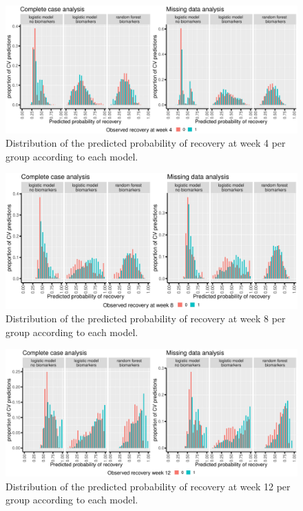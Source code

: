 \documentclass[12pt]{article}
\begin{document}
\begin{figure}[!h]
\centering
\includegraphics[trim={0 0 0 0},width=\textwidth]{./../figures/hist-pred-week4.pdf}
\caption{\label{fig:perfW4-dens}Distribution of the predicted probability of recovery at week 4 per group according to each model.}
\end{figure}

\begin{figure}[!h]
\centering
\includegraphics[trim={0 0 0 0},width=\textwidth]{./../figures/hist-pred-week8.pdf}
\caption{\label{fig:perfW8-dens}Distribution of the predicted probability of recovery at week 8 per group according to each model.}
\end{figure}

\clearpage

\begin{figure}[!h]
\centering
\includegraphics[trim={0 0 0 0},width=\textwidth]{./../figures/hist-pred-week12.pdf}
\caption{\label{fig:perfW12-dens}Distribution of the predicted probability of recovery at week 12 per group according to each model.}
\end{figure}
\end{document}
